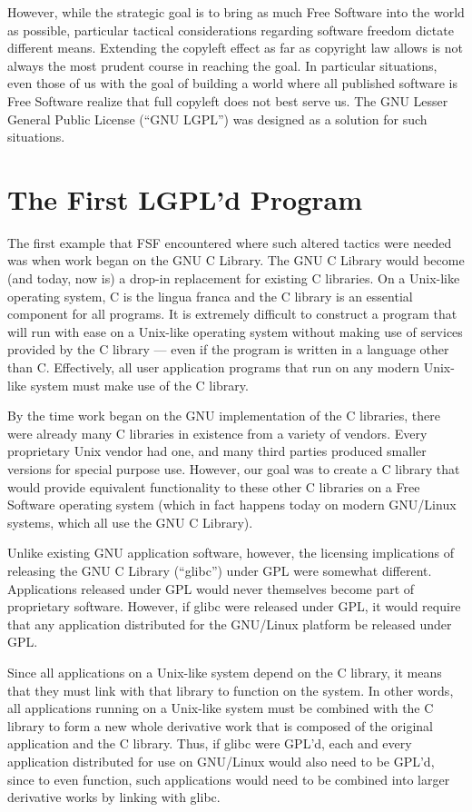 However, while the strategic goal is to bring as much Free Software
into the world as possible, particular tactical considerations
regarding software freedom dictate different means. Extending the
copyleft effect as far as copyright law allows is not always the most
prudent course in reaching the goal. In particular situations, even
those of us with the goal of building a world where all published
software is Free Software realize that full copyleft does not best
serve us. The GNU Lesser General Public License (``GNU LGPL'') was
designed as a solution for such situations.

\section{The First LGPL'd Program}

The first example that FSF encountered where such altered tactics were
needed was when work began on the GNU C Library. The GNU C Library would
become (and today, now is) a drop-in replacement for existing C libraries.
On a Unix-like operating system, C is the lingua franca and the C library
is an essential component for all programs. It is extremely difficult to
construct a program that will run with ease on a Unix-like operating
system without making use of services provided by the C library --- even
if the program is written in a language other than C\@. Effectively, all
user application programs that run on any modern Unix-like system must
make use of the C library.

By the time work began on the GNU implementation of the C libraries, there
were already many C libraries in existence from a variety of vendors.
Every proprietary Unix vendor had one, and many third parties produced
smaller versions for special purpose use. However, our goal was to create
a C library that would provide equivalent functionality to these other C
libraries on a Free Software operating system (which in fact happens today
on modern GNU/Linux systems, which all use the GNU C Library).

Unlike existing GNU application software, however, the licensing
implications of releasing the GNU C Library (``glibc'') under GPL were
somewhat different. Applications released under GPL would never
themselves become part of proprietary software. However, if glibc were
released under GPL, it would require that any application distributed for
the GNU/Linux platform be released under GPL\@.

Since all applications on a Unix-like system depend on the C library, it
means that they must link with that library to function on the system. In
other words, all applications running on a Unix-like system must be
combined with the C library to form a new whole derivative work that is
composed of the original application and the C library. Thus, if glibc
were GPL'd, each and every application distributed for use on GNU/Linux
would also need to be GPL'd, since to even function, such applications
would need to be combined into larger derivative works by linking with
glibc.

